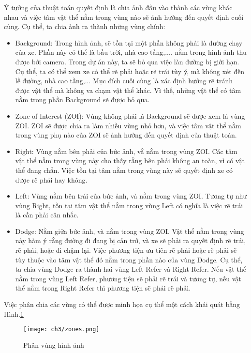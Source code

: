 	Ý tưởng của thuật toán quyết định là chia ảnh đầu vào thành các vùng khác nhau và việc tâm vật thể nằm trong vùng nào sẽ ảnh hưởng đến quyết định cuối cùng. Cụ thể, ta chia ảnh ra thành những vùng chính:
	\begin{itemize}
		\item Background: Trong hình ảnh, sẽ tồn tại một phần không phải là đường chạy của xe. Phần này có thể là bầu trời, nhà cao tầng,.... nằm trong hình ảnh thu được bởi camera. Trong dự án này, ta sẽ bỏ qua việc làn đường bị giới hạn. Cụ thể, ta có thể xem xe có thể rẽ phải hoặc rẽ trái tùy ý, mà không xét đến lề đường, nhà cao tầng,... Mục đích cuối cùng là xác định hướng rẽ tránh được vật thể mà không va chạm vật thể khác. Vì thế, những vật thể có tâm nằm trong phần Background sẽ được bỏ qua.

		\item Zone of Interest (ZOI): Vùng không phải là Background sẽ được xem là vùng ZOI. ZOI sẽ được chia ra làm nhiều vùng nhỏ hơn, và việc tâm vật thể nằm trong vùng phụ nào của ZOI sẽ ảnh hưởng đến quyết định của thuật toán.

		\item Right: Vùng nằm bên phải của bức ảnh, vằ nằm trong vùng ZOI. Các tâm vật thể nằm trong vùng này cho thấy rằng bên phải không an toàn, vì có vật thể đang chắn. Việc tồn tại tâm nằm trong vùng này sẽ quyết định xe có được rẽ phải hay không.

		\item Left: Vùng nằm bên trái của bức ảnh, và nằm trong vùng ZOI. Tương tự như vùng Right, tồn tại tâm vật thể nằm trong vùng Left có nghĩa là việc rẽ trái là cần phải cân nhắc.

		\item Dodge: Nằm giữa bức ảnh, và nằm trong vùng ZOI. Vật thể nằm trong vùng này hàm ý rằng đường đi đang bị cản trở, và xe sẽ phải ra quyết định rẽ trái, rẽ phải, hoặc đi chậm lại. Việc phương tiện ưu tiên rẽ phải hoặc rẽ phải sẽ tùy thuộc vào tâm vật thể đó nằm trong phần nào của vùng Dodge. Cụ thể, ta chia vùng Dodge ra thành hai vùng Left Refer và Right Refer. Nếu vật thể nằm trong vùng Left Refer, phương tiện sẽ phải rẽ trái và tương tự, nếu vật thể nằm trong Right Refer thì phương tiện sẽ phải rẽ phải. 

	\end{itemize}		
Việc phân chia các vùng có thể được minh họa cụ thể một cách khái quát bằng Hình.\ref{fig:zones}
		\begin{figure}[h]
 		\label{fig:zones}
		\begin{center}
		\texttt{[image: ch3/zones.png]} %
		\caption{Phân vùng hình ảnh}
		\end{center}
		\end{figure}	

